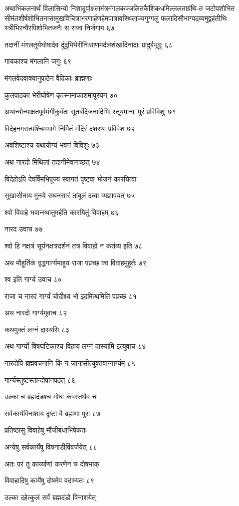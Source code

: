 अथाभिकलनार्थं विलासिन्यो निशादूर्वाक्षतामंत्रमंगलकज्जलितकैशिकधमिल्ललताग्रंथि-त
जटोपशोभित सीमंतशीर्षशोभितनासामुखविचित्राभरणार्हणहेमपात्रावस्थिताज्यगुग्गलु
फलादिसौभाग्यद्रव्यमुद्वहंतीभिः स्त्रीभिरन्यैरपिशोभितजनैः स राजा निर्जगाम ६७

तदानीं मंगलतुर्यघोषादेव दुंदुभिभेरीनिःसाणमर्दलशंखादिनादाः प्रादुर्बभूवुः ६८

गायकाश्च मंगलानि जगुः ६९

मंगलवेदवाक्यानुपाठेन वैदिकाः ब्राह्मणाः

कुलपाठका भेरीघोषेण कृत्स्नमाकाशमापूरयन् ७०

अथान्योन्याक्षतपूर्वमंगीकुर्वंतः सूतबंदिजनादिभिः स्तूयमानाः पुरं प्रविविशुः ७१

विदेहनगरात्पश्चिमभागे निर्मितं मंदिरं दशरथः प्रविवेश ७२

अवशिष्टाश्च यथायोग्यं भवनं विविशुः ७३

अथ नारदो मिथिलां तदानीमेवागच्छत् ७४

विदेहोऽपि देवर्षिमभिपूज्य स्वागतं दृष्ट्वा भोजनं कारयित्वा

सुखासीनाय मुनये सघनसारं तांबूलं दत्वा व्यज्ञापयत् ७५

श्वो विवाहे भवान्स्थातुमर्हति कारयितुं विवाहम् ७६

नारद उवाच ७७

श्वो हि नक्षत्रं सूर्यनक्षत्रदर्शनं तत्र विवाहो न कर्तव्य इति ७८

अथ मौहूर्तिकं वृद्धगार्ग्यमाहूय राजा पप्रच्छ क्व विवाहमुहूर्तः ७९

श्व इति गार्ग्य उवाच ८०

राजा च नारदं गार्ग्यं चोदीक्ष्य भो इदमित्थमिति पप्रच्छ ८१

अथ नारदो गार्ग्यमुवाच ८२

कथमुक्तं लग्नं दास्यसि ८३

अथ गार्ग्यो विषघटिकाश्च विहाय लग्नं दास्यामि इत्युवाच ८४

नारदोपि ब्रह्मवचनानि किं न जानासीत्युक्तवान्गार्ग्यम् ८५

गार्ग्यस्तुष्टस्तान्दोषानपठत् ८६

उल्का च ब्रह्मदंडश्च मोघः कंपस्तथैव च

सर्वकार्यविनाशाय दृष्टा वै ब्रह्मणा पुरा ८७

प्रतिष्ठासु विवाहेषु मौंजीबंधाभिषेकतः

अन्येषु सर्वकार्येषु विषनाडीर्विवर्जयेत् ८८

अतः परं तु कार्य्याणां करणेन च दोषभाक्

विवाहादिषु कार्येषु दोषमेव वदाम्यतः ८९

उल्का दहेत्कुलं सर्वं ब्रह्मदंडो विनाशयेत्

